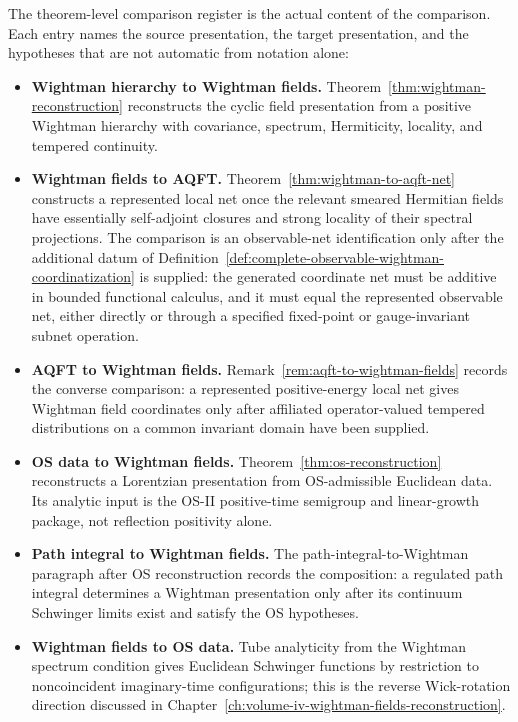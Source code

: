 The theorem-level comparison register is the actual content of the comparison.
Each entry names the source presentation, the target presentation, and the
hypotheses that are not automatic from notation alone:
\begin{itemize}[leftmargin=*]
\item \textbf{Wightman hierarchy to Wightman fields.}
Theorem~\ref{thm:wightman-reconstruction} reconstructs the cyclic field
presentation from a positive Wightman hierarchy with covariance, spectrum,
Hermiticity, locality, and tempered continuity.
\item \textbf{Wightman fields to AQFT.}
Theorem~\ref{thm:wightman-to-aqft-net} constructs a represented local net once
the relevant smeared Hermitian fields have essentially self-adjoint closures
and strong locality of their spectral projections.  The comparison is an
observable-net identification only after the additional datum of
Definition~\ref{def:complete-observable-wightman-coordinatization} is supplied:
the generated coordinate net must be additive in bounded functional calculus,
and it must equal the represented observable net, either directly or through a
specified fixed-point or gauge-invariant subnet operation.
\item \textbf{AQFT to Wightman fields.}
Remark~\ref{rem:aqft-to-wightman-fields} records the converse comparison:
a represented positive-energy local net gives Wightman field coordinates only
after affiliated operator-valued tempered distributions on a common invariant
domain have been supplied.
\item \textbf{OS data to Wightman fields.}
Theorem~\ref{thm:os-reconstruction} reconstructs a Lorentzian presentation
from OS-admissible Euclidean data.  Its analytic input is the OS-II
positive-time semigroup and linear-growth package, not reflection positivity
alone.
\item \textbf{Path integral to Wightman fields.}
The path-integral-to-Wightman paragraph after OS reconstruction records the
composition: a regulated path integral determines a Wightman presentation only
after its continuum Schwinger limits exist and satisfy the OS hypotheses.
\item \textbf{Wightman fields to OS data.}
Tube analyticity from the Wightman spectrum condition gives Euclidean
Schwinger functions by restriction to noncoincident imaginary-time
configurations; this is the reverse Wick-rotation direction discussed in
Chapter~\ref{ch:volume-iv-wightman-fields-reconstruction}.
\end{itemize}

